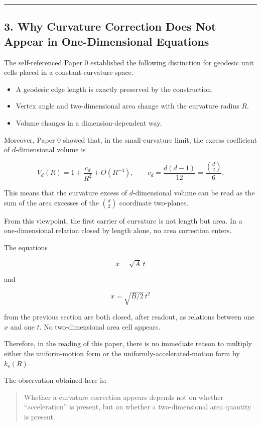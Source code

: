 \documentclass[
]{ltjsarticle}
\providecommand{\tightlist}{%
  \setlength{\itemsep}{0pt}\setlength{\parskip}{0pt}}
\begin{document}
\begin{center}\rule{0.5\linewidth}{0.5pt}\end{center}

\subsection{3. Why Curvature Correction Does Not Appear in
One-Dimensional
Equations}\label{why-curvature-correction-does-not-appear-in-one-dimensional-equations}

The self-referenced Paper 0 established the following distinction for
geodesic unit cells placed in a constant-curvature space.

\begin{itemize}
\tightlist
\item
  A geodesic edge length is exactly preserved by the construction.
\item
  Vertex angle and two-dimensional area change with the curvature radius
  \(R\).
\item
  Volume changes in a dimension-dependent way.
\end{itemize}

Moreover, Paper 0 showed that, in the small-curvature limit, the excess
coefficient of \(d\)-dimensional volume is

\[
V_d(R)=1+\frac{c_d}{R^2}+O(R^{-4}),
\qquad
c_d=\frac{d(d-1)}{12}
=\frac{\binom{d}{2}}{6}.
\]

This means that the curvature excess of \(d\)-dimensional volume can be
read as the sum of the area excesses of the \(\binom{d}{2}\) coordinate
two-planes.

From this viewpoint, the first carrier of curvature is not length but
area. In a one-dimensional relation closed by length alone, no area
correction enters.

The equations

\[
x=\sqrt{A}\,t
\]

and

\[
x=\sqrt{B/2}\,t^2
\]

from the previous section are both closed, after readout, as relations
between one \(x\) and one \(t\). No two-dimensional area cell appears.

Therefore, in the reading of this paper, there is no immediate reason to
multiply either the uniform-motion form or the
uniformly-accelerated-motion form by \(k_s(R)\).

The observation obtained here is:

\begin{quote}
Whether a curvature correction appears depends not on whether
``acceleration'' is present, but on whether a two-dimensional area
quantity is present.
\end{quote}
\end{document}
